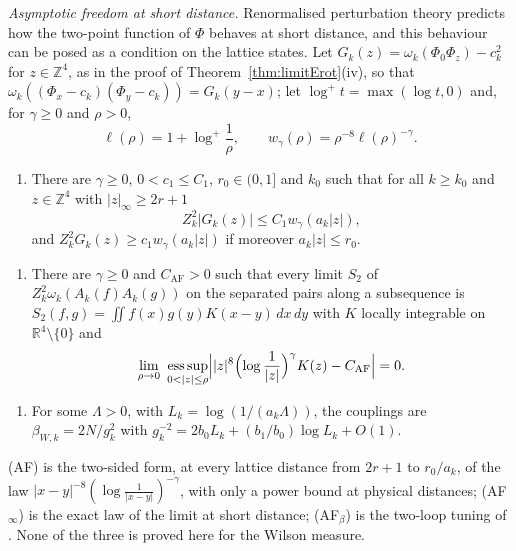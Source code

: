 \documentclass[aps,prd,twocolumn,superscriptaddress,nofootinbib,longbibliography,floatfix,amsmath,amssymb,10pt]{revtex4-2}
\theoremstyle{definition}
\theoremstyle{remark}
\newcommand{\R}{\mathbb{R}}
\newcommand{\Z}{\mathbb{Z}}
\begin{document}
\emph{Asymptotic freedom at short distance.} Renormalised perturbation
theory predicts how the two-point function of $\Phi$ behaves at short
distance, and this behaviour can be posed as a condition on the lattice
states. Let $G_k(z)=\omega_k(\Phi_0\Phi_z)-
c_k^2$ for $z\in\Z^4$, as in the proof of Theorem~\ref{thm:limitErot}(iv),
so that $\omega_k((\Phi_x-c_k)(\Phi_y-c_k))=G_k(y-x)$; let
$\log^+t=\max(\log t,0)$ and, for $\gamma\ge0$ and $\rho>0$,
\[
\ell(\rho)=1+\log^+\frac1\rho,\qquad w_\gamma(\rho)=\rho^{-8}\ell(\rho)^
{-\gamma} .
\]
\begin{enumerate}[label=\textup{(AF)},leftmargin=*]
\item There are $\gamma\ge0$, $0<c_1\le C_1$, $r_0\in(0,1]$ and $k_0$ such
that for all $k\ge k_0$ and $z\in\Z^4$ with $|z|_\infty\ge2r+1$
\[
Z_k^2|G_k(z)|\le C_1w_\gamma(a_k|z|),
\]
and $Z_k^2G_k(z)\ge c_1w_\gamma(a_k|z|)$ if moreover $a_k|z|\le r_0$.
\end{enumerate}
\begin{enumerate}[label=\textup{(AF$_\infty$)},leftmargin=*]
\item There are $\gamma\ge0$ and $C_{\mathrm{AF}}>0$ such that every limit
$S_2$ of $Z_k^2\omega_k(A_k(f)A_k(g))$ on the separated pairs along a
subsequence is $S_2(f,g)=\iint f(x)g(y)K(x-y)\,dx\,dy$ with $K$ locally
integrable on $\R^4\setminus\{0\}$ and
\[
\lim_{\rho\to0}\ \operatorname*{ess\,sup}_{0<|z|\le\rho}\Bigl||z|^8\Bigl(
\log\frac1{|z|}\Bigr)^\gamma K(z)-C_{\mathrm{AF}}\Bigr|=0 .
\]
\end{enumerate}
\begin{enumerate}[label=\textup{(AF$_\beta$)},leftmargin=*]
\item For some $\Lambda>0$, with $L_k=\log(1/(a_k\Lambda))$, the couplings
are $\beta_{W,k}=2N/g_k^2$ with $g_k^{-2}=2b_0L_k+(b_1/b_0)\log L_k+O(1)$.
\end{enumerate}
(AF) is the two-sided form, at every lattice distance from $2r+1$ to
$r_0/a_k$, of the law $|x-y|^{-8}(\log\frac1{|x-y|})^{-\gamma}$, with only
a power bound at physical distances; (AF$_\infty$) is the exact law of the
limit at short distance; (AF$_\beta$) is the two-loop tuning of
\cite[Remark~247]{BBLR26}. None of the three is proved here for the Wilson
measure.
\end{document}
